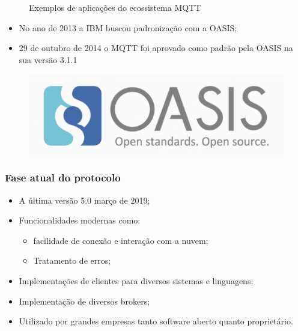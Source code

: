 \documentclass[12pt]{beamer}
\begin{document}
\begin{frame}[allowframebreaks]
\begin{figure}[!htb]
\begin{columns}[c]
\begin{column}{.5\textwidth}
            \end{column}
        \end{columns}
        \caption{\label{fig:logos_ferramentas_mqtt}Exemplos de aplicações do ecossistema MQTT}
    \end{figure}
    \framebreak
    \begin{itemize}
        \item No ano de 2013 a IBM buscou padronização com a OASIS;
        \item 29 de outubro de 2014 o MQTT foi aprovado como padrão pela OASIS na sua versão 3.1.1
    \end{itemize}
    \begin{figure}[!htb]
        \centering
        \includegraphics[width=.8\textwidth]{Oasis_logo}
    \end{figure}
\end{frame}

\begin{frame}
    \frametitle{Fase atual do protocolo}
    \begin{itemize}
        \item A última versão 5.0 março de 2019;
        \item Funcionalidades modernas como:
            \begin{itemize}
                \item facilidade de conexão e interação com a nuvem;
                \item Tratamento de erros;
            \end{itemize}
        \item Implementações de clientes para diversos sistemas e linguagens;
        \item Implementação de diversos brokers;
        \item Utilizado por grandes empresas tanto software aberto quanto proprietário.
    \end{itemize}
\end{frame}
\end{document}
